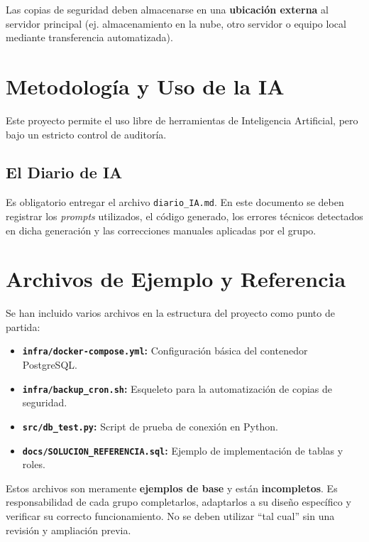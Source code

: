 \documentclass[12pt,a4paper,spanish,es-tabla,es-noshorthands]{article}
\begin{document}
\begin{tcolorbox}[title=Seguridad Crítica]
Las copias de seguridad deben almacenarse en una \textbf{ubicación externa} al servidor principal (ej. almacenamiento en la nube, otro servidor o equipo local mediante transferencia automatizada).
\end{tcolorbox}

\section{Metodología y Uso de la IA}
Este proyecto permite el uso libre de herramientas de Inteligencia Artificial, pero bajo un estricto control de auditoría.

\subsection{El Diario de IA}
Es obligatorio entregar el archivo \texttt{diario\_IA.md}. En este documento se deben registrar los \textit{prompts} utilizados, el código generado, los errores técnicos detectados en dicha generación y las correcciones manuales aplicadas por el grupo.

\section{Archivos de Ejemplo y Referencia}
Se han incluido varios archivos en la estructura del proyecto como punto de partida:
\begin{itemize}
    \item \textbf{\texttt{infra/docker-compose.yml}:} Configuración básica del contenedor PostgreSQL.
    \item \textbf{\texttt{infra/backup\_cron.sh}:} Esqueleto para la automatización de copias de seguridad.
    \item \textbf{\texttt{src/db\_test.py}:} Script de prueba de conexión en Python.
    \item \textbf{\texttt{docs/SOLUCION\_REFERENCIA.sql}:} Ejemplo de implementación de tablas y roles.
\end{itemize}

\begin{tcolorbox}[title=Aviso Importante]
Estos archivos son meramente \textbf{ejemplos de base} y están \textbf{incompletos}. Es responsabilidad de cada grupo completarlos, adaptarlos a su diseño específico y verificar su correcto funcionamiento. No se deben utilizar \enquote{tal cual} sin una revisión y ampliación previa.
\end{tcolorbox}
\end{document}
